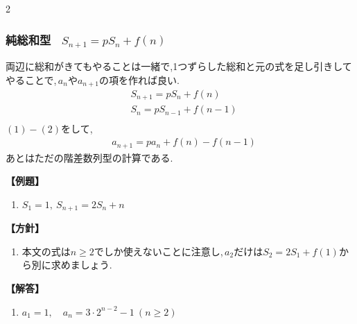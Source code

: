 \documentclass[dvipdfmx,a4paper,11pt,fleqn,openany]{jsbook}
\begin{document}
\begin{multicols*}{2}
    \subsubsection{純総和型 \, $S_{n+1}=pS_n+f(n) $}
      両辺に総和がきてもやることは一緒で,1つずらした総和と元の式を足し引きしてやることで,\,$a_n$や$a_{n+1}$の項を作れば良い.
      \begin{align*}
        &S_{n+1}=pS_n+f(n) \tag*{\(\cdots\) (1)}\\
        &S_{n}=pS_{n-1}+f(n-1) \tag*{\(\cdots\) (2)}\\
      \end{align*}
        $(1)-(2)$をして,
      \begin{align*}
        &a_{n+1}=pa_{n}+f(n)-f(n-1)
      \end{align*}
      あとはただの階差数列型の計算である.

      \noindent \textbf{【例題】}
      \begin{enumerate}[label=(\arabic*),parsep=3pt]
        \item $\displaystyle S_1=1,\ S_{n+1}=2S_n+n$
      \end{enumerate}

      \noindent\textbf{【方針】}
      \begin{enumerate}[label=(\arabic*),parsep=3pt]
        \item 本文の式は$n\ge2$でしか使えないことに注意し,\,$a_2$だけは$S_2=2S_1+f(1)$から別に求めましょう.
      \end{enumerate}

      \noindent\textbf{【解答】}
      \begin{enumerate}[label=(\arabic*),parsep=3pt]
        \item $\displaystyle a_1=1,\quad a_n=3\cdot2^{n-2}-1\ (n\ge2)$
      \end{enumerate}


\end{multicols*}
\end{document}

